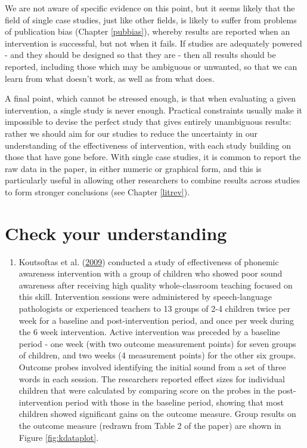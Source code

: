 \documentclass{krantz}
\providecommand{\tightlist}{%
\setlength{\itemsep}{0pt}\setlength{\parskip}{0pt}}
\begin{document}
We are not aware of specific evidence on this point, but it seems likely that the field of single case studies, just like other fields, is likely to suffer from problems of publication bias (Chapter \ref{pubbias}), whereby results are reported when an intervention is successful, but not when it fails. If studies are adequately powered - and they should be designed so that they are - then all results should be reported, including those which may be ambiguous or unwanted, so that we can learn from what doesn't work, as well as from what does.

A final point, which cannot be stressed enough, is that when evaluating a given intervention, a single study is never enough. Practical constraints usually make it impossible to devise the perfect study that gives entirely unambiguous results: rather we should aim for our studies to reduce the uncertainty in our understanding of the effectiveness of intervention, with each study building on those that have gone before. With single case studies, it is common to report the raw data in the paper, in either numeric or graphical form, and this is particularly useful in allowing other researchers to combine results across studies to form stronger conclusions (see Chapter \ref{litrev}).

\hypertarget{check-your-understanding-19}{%
\section{Check your understanding}\label{check-your-understanding-19}}

\begin{enumerate}
\def\labelenumi{\arabic{enumi}.}
\tightlist
\item
  Koutsoftas et al. (\protect\hyperlink{ref-koutsoftas2009}{2009}) conducted a study of effectiveness of phonemic awareness intervention with a group of children who showed poor sound awareness after receiving high quality whole-classroom teaching focused on this skill. Intervention sessions were administered by speech-language pathologists or experienced teachers to 13 groups of 2-4 children twice per week for a baseline and post-intervention period, and once per week during the 6 week intervention. Active intervention was preceded by a baseline period - one week (with two outcome measurement points) for seven groups of children, and two weeks (4 measurement points) for the other six groups. Outcome probes involved identifying the initial sound from a set of three words in each session. The researchers reported effect sizes for individual children that were calculated by comparing score on the probes in the post-intervention period with those in the baseline period, showing that most children showed significant gains on the outcome measure. Group results on the outcome measure (redrawn from Table 2 of the paper) are shown in Figure \ref{fig:kdataplot}.
\end{enumerate}
\end{document}

